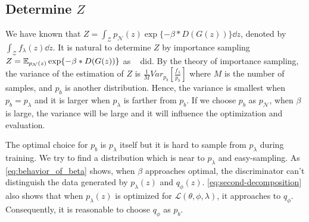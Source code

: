 \subsection{Determine $Z$}\label{subsec:determine_z}

We have known that $Z = \int_{\mathcal{Z}} p_\mathcal{N}(z) \exp\{- \beta * D(G(z))\} \dd z$, denoted by $\int_{\mathcal{Z}} f_\lambda(z) \dd z$. It is natural to determine $Z$ by importance sampling $Z = \operatorname{\mathbb{E}}_{p_\mathcal{N}(z)} \exp\{- \beta * D(G(z))\}$ as ~\cite{bauer2019resampled} did. By the theory of importance sampling, the variance of the estimation of $Z$ is $\frac{1}{M} Var_{p_b}[\frac{f_\lambda}{p_b}]$ where $M$ is the number of samples, and $p_b$ is another distribution. Hence, the variance is smallest when $p_b = p_\lambda$ and it is larger when $p_\lambda$ is farther from $p_b$. If we choose $p_b$ as $p_\mathcal{N}$, when $\beta$ is large, the variance will be large and it will influence the optimization and evaluation. 

The optimal choice for $p_b$ is $p_\lambda$ itself but it is hard to sample from $p_\lambda$ during training. We try to find a distribution which is near to $p_\lambda$ and easy-sampling. As \cref{eq:behavior_of_beta} shows, when $\beta$ approaches optimal, the discriminator can't distinguish the data generated by $p_\lambda(z)$ and $q_\phi(z)$.  \cref{eq:second-decomposition} also shows that when $p_\lambda(z)$ is optimized for $\mathcal{L}(\theta, \phi, \lambda)$, it approaches to $q_\phi$. Consequently, it is reasonable to choose $q_\phi$ as $p_b$. 

